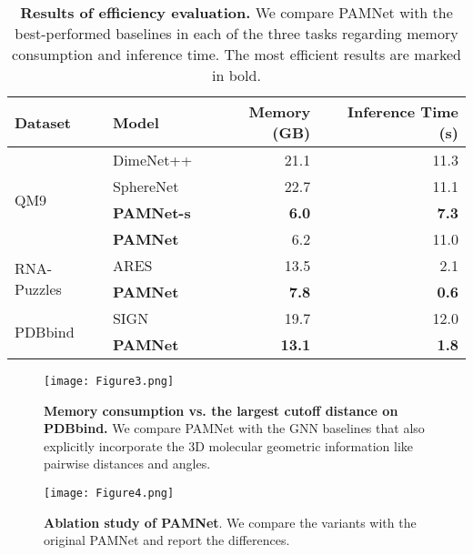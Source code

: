 \documentclass[fleqn,10pt]{wlscirep}
\newcommand{\method}{PAMNet\xspace}
\begin{document}
\begin{table}[t]
\small
\centering
\begin{tabular}{llrr}
\toprule
    Dataset & Model & Memory (GB) & Inference Time (s) \\
\midrule
    \multirow{4}{*}{QM9} & DimeNet++ & 21.1 & 11.3 \\
     & SphereNet & 22.7 & 11.1 \\
     & \textbf{\method-s} & \textbf{6.0} & \textbf{7.3} \\
     & \textbf{\method} & 6.2 & 11.0 \\
\midrule
    \multirow{2}{*}{RNA-Puzzles} & ARES & 13.5 & 2.1 \\
     & \textbf{\method} & \textbf{7.8} & \textbf{0.6} \\
\midrule
    \multirow{2}{*}{PDBbind} & SIGN & 19.7 & 12.0 \\
     & \textbf{\method} & \textbf{13.1} & \textbf{1.8} \\
\bottomrule
\end{tabular}
\caption{\textbf{Results of efficiency evaluation.} We compare \method with the best-performed baselines in each of the three tasks regarding memory consumption and inference time. The most efficient results are marked in bold.}
\label{table:efficiency}
\end{table}


\begin{figure}[t]
    \centering
    \texttt{[image: Figure3.png]}
    \caption{\textbf{Memory consumption vs. the largest cutoff distance  on PDBbind.} We compare \method with the GNN baselines that also explicitly incorporate the 3D molecular geometric information like pairwise distances and angles.}
    \label{fig:efficiency}
\end{figure}


\begin{figure}[t]
    \centering
    \texttt{[image: Figure4.png]}
    \caption{\textbf{Ablation study of \method}. We compare the variants with the original \method and report the differences.}
    \label{fig:ablation}
\end{figure}
\end{document}
